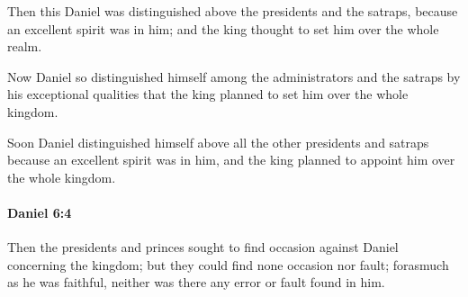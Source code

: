 			\begin{versebox}
					\item[BHS] 
					\item[LXX] 
					\item[ASV] Then this Daniel was distinguished above the presidents and the satraps, because an excellent spirit was in him; and the king thought to set him over the whole realm.
					\item[NIV] Now Daniel so distinguished himself among the administrators and the satraps by his exceptional qualities that the king planned to set him over the whole kingdom.
					\item[NRSV] Soon Daniel distinguished himself above all the other presidents and satraps because an excellent spirit was in him, and the king planned to appoint him over the whole kingdom.
			\end{versebox}

		\paragraph{Daniel 6:4} %
			\label{DANIEL-6-4}

			Then the presidents and princes sought to find occasion against Daniel concerning the kingdom; but they could find none occasion nor fault; forasmuch as he was faithful, neither was there any error or fault found in him.


